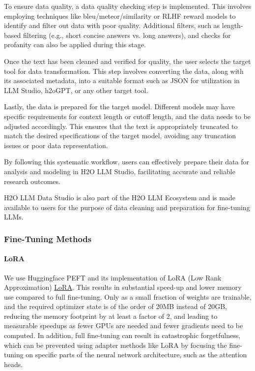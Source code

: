 \documentclass{article}
\begin{document}
To ensure data quality, a data quality checking step is implemented. This involves employing techniques like bleu/meteor/similarity or RLHF reward models to identify and filter out data with poor quality. Additional filters, such as length-based filtering (e.g., short concise answers vs. long answers), and checks for profanity can also be applied during this stage.

Once the text has been cleaned and verified for quality, the user selects the target tool for data transformation. This step involves converting the data, along with its associated metadata, into a suitable format such as JSON for utilization in LLM Studio, h2oGPT, or any other target tool.

Lastly, the data is prepared for the target model. Different models may have specific requirements for context length or cutoff length, and the data needs to be adjusted accordingly. This ensures that the text is appropriately truncated to match the desired specifications of the target model, avoiding any truncation issues or poor data representation.

By following this systematic workflow, users can effectively prepare their data for analysis and modeling in H2O LLM Studio, facilitating accurate and reliable research outcomes.

H2O LLM Data Studio is also part of the H2O LLM Ecosystem and is made available to users for the purpose of data cleaning and preparation for fine-tuning LLMs. 

\subsubsection{Fine-Tuning Methods}

\paragraph{LoRA}
We use Huggingface PEFT and its implementation of LoRA (Low Rank Approximation) \href{https://arxiv.org/abs/2106.09685}{LoRA}. This results in substantial speed-up and lower memory use compared to full fine-tuning. Only as a small fraction of weights are trainable, and the required optimizer state is of the order of 20MB instead of 20GB, reducing the memory footprint by at least a factor of 2, and leading to measurable speedups as fewer GPUs are needed and fewer gradients need to be computed. In addition, full fine-tuning can result in catastrophic forgetfulness,
which can be prevented using adapter methods like LoRA by focusing the fine-tuning on specific parts
of the neural network architecture, such as the attention heads.
\end{document}
